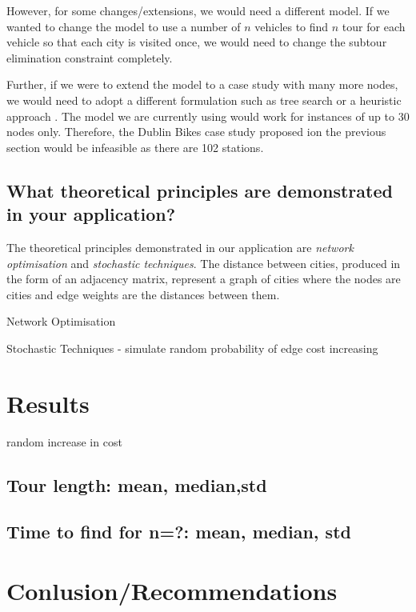 \documentclass[a4paper,11pt]{article}
\begin{document}
However, for some changes/extensions, we would need a different model. If we wanted to change the model to use a number of $n$ vehicles to find $n$ tour for each vehicle so that each city is visited once, we would need to change the subtour elimination constraint completely. 

Further, if we were to extend the model to a case study with many more nodes, we would need to adopt a different formulation such as tree search or a heuristic approach \cite{gueret1999applications}. The model we are currently using would work for instances of up to 30 nodes only. Therefore, the Dublin Bikes case study proposed ion the previous section would be infeasible as there are 102 stations.



\subsection{What theoretical principles are demonstrated in your application?}

The theoretical principles demonstrated in our application are \textit{network optimisation} and \textit{stochastic techniques}. The distance between cities, produced in the form of an adjacency matrix, represent a graph of cities where the nodes are cities and edge weights are the distances between them.

Network Optimisation


Stochastic Techniques - simulate random probability of edge cost increasing

\section{Results}

random increase in cost

\subsection{Tour length: mean, median,std}

\subsection{Time to find for n=?: mean, median, std}

\section{Conlusion/Recommendations}
\end{document}
